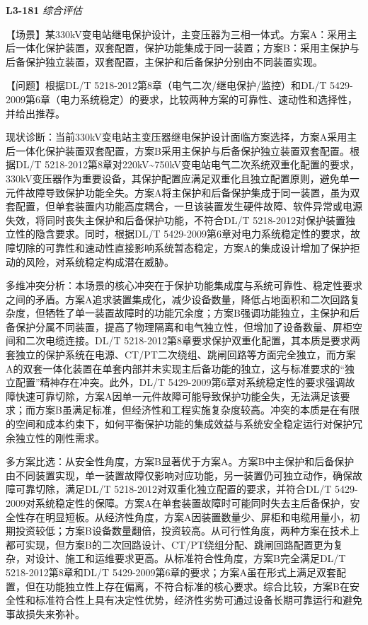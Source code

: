 \documentclass[12pt,a4paper]{ctexart}
\begin{document}
\noindent\textbf{L3-181} \hfill \textit{综合评估}
\begin{description}[leftmargin=1.5em,style=nextline,font=\normalfont]
  \item[Q:] 【场景】某330kV变电站继电保护设计，主变压器为三相一体式。方案A：采用主后一体化保护装置，双套配置，保护功能集成于同一装置；方案B：采用主保护与后备保护独立装置，双套配置，主保护和后备保护分别由不同装置实现。

【问题】根据DL/T 5218-2012第8章（电气二次/继电保护/监控）和DL/T 5429-2009第6章（电力系统稳定）的要求，比较两种方案的可靠性、速动性和选择性，并给出推荐。
  \item[A:] 现状诊断：当前330kV变电站主变压器继电保护设计面临方案选择，方案A采用主后一体化保护装置双套配置，方案B采用主保护与后备保护独立装置双套配置。根据DL/T 5218-2012第8章对220kV\textasciitilde{}750kV变电站电气二次系统双重化配置的要求，330kV变压器作为重要设备，其保护配置应满足双重化且独立配置原则，避免单一元件故障导致保护功能全失。方案A将主保护和后备保护集成于同一装置，虽为双套配置，但单套装置内功能高度耦合，一旦该装置发生硬件故障、软件异常或电源失效，将同时丧失主保护和后备保护功能，不符合DL/T 5218-2012对保护装置独立性的隐含要求。同时，根据DL/T 5429-2009第6章对电力系统稳定性的要求，故障切除的可靠性和速动性直接影响系统暂态稳定，方案A的集成设计增加了保护拒动的风险，对系统稳定构成潜在威胁。

多维冲突分析：本场景的核心冲突在于保护功能集成度与系统可靠性、稳定性要求之间的矛盾。方案A追求装置集成化，减少设备数量，降低占地面积和二次回路复杂度，但牺牲了单一装置故障时的功能冗余度；方案B强调功能独立，主保护和后备保护分属不同装置，提高了物理隔离和电气独立性，但增加了设备数量、屏柜空间和二次电缆连接。DL/T 5218-2012第8章要求保护双重化配置，其本质是要求两套独立的保护系统在电源、CT/PT二次绕组、跳闸回路等方面完全独立，而方案A的双套一体化装置在单套内部并未实现主后备功能的独立，这与标准要求的“独立配置”精神存在冲突。此外，DL/T 5429-2009第6章对系统稳定性的要求强调故障快速可靠切除，方案A因单一元件故障可能导致保护功能全失，无法满足该要求；而方案B虽满足标准，但经济性和工程实施复杂度较高。冲突的本质是在有限的空间和成本约束下，如何平衡保护功能的集成效益与系统安全稳定运行对保护冗余独立性的刚性需求。

多方案比选：从安全性角度，方案B显著优于方案A。方案B中主保护和后备保护由不同装置实现，单一装置故障仅影响对应功能，另一装置仍可独立动作，确保故障可靠切除，满足DL/T 5218-2012对双重化独立配置的要求，并符合DL/T 5429-2009对系统稳定性的保障。方案A在单套装置故障时可能同时失去主后备保护，安全性存在明显短板。从经济性角度，方案A因装置数量少、屏柜和电缆用量小，初期投资较低；方案B设备数量翻倍，投资较高。从可行性角度，两种方案在技术上都可实现，但方案B的二次回路设计、CT/PT绕组分配、跳闸回路配置更为复杂，对设计、施工和运维要求更高。从标准符合性角度，方案B完全满足DL/T 5218-2012第8章和DL/T 5429-2009第6章的要求；方案A虽在形式上满足双套配置，但在功能独立性上存在偏离，不符合标准的核心要求。综合比较，方案B在安全性和标准符合性上具有决定性优势，经济性劣势可通过设备长期可靠运行和避免事故损失来弥补。


\end{description}
\end{document}
